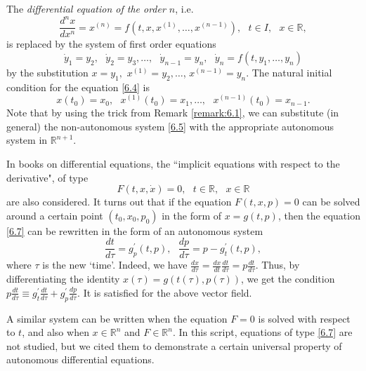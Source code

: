 The \emph{differential equation of the order $n$}, i.e.
\begin{equation}
\label{6.4}
\frac{d^{n}x}{dx^{n}}=x^{(n)}=f(t,x,x^{(1)},\ldots ,x^{(n-1)}),\text{ \ }%
t\in I,\text{\ }x\in \mathbb{R},
\end{equation}
is replaced by the system of first order equations
\begin{equation}
\label{6.5}
\dot{y}_{1}=y_{2},\text{ }\dot{y}_{2}=y_{3},\ldots ,\text{ }\dot{y}%
_{n-1}=y_{n},\text{ }\dot{y}_{n}=f(t,y_{1},\ldots ,y_{n})
\end{equation}
by the substitution $x=y_{1},$ $x^{(1)}=y_{2},\ldots$, $x^{(n-1)} = y_{n}$. The natural initial condition for the equation \eqref{6.4} is
\begin{equation}
\label{6.6}
x(t_{0})=x_{0},\text{ }x^{(1)}(t_{0})=x_{1},\ldots ,\text{\ }%
x^{(n-1)}(t_{0})=x_{n-1}.
\end{equation}
Note that by using the trick from Remark \ref{remark:6.1}, we can substitute (in general) the non-autonomous system \eqref{6.5} with the appropriate autonomous system in $\mathbb{R}^{n+1}.$

\begin{remark}
	In books on differential equations, the ``implicit equations with respect to the derivative", of type
	\begin{equation}
	\label{6.7}
	F(t,x,\dot{x})=0,\text{ \ \ }t\in \mathbb{R},\text{ \ }x\in \mathbb{R}
	\end{equation}
	are also considered. It turns out that if the equation $F(t,x,p)=0$ can be solved around a certain point $\left(t_{0}, x_{0}, p_{0}\right) $ in the form of $x=g(t,p)$, then the equation \eqref{6.7} can be rewritten in the form of an autonomous system
	$$
	\frac{dt}{d\tau }=g_{p}^{\prime }(t,p),\text{ \ }\frac{dp}{d\tau } = p-g_{t}^{\prime }(t,p),
	$$
	where $\tau$ is the new `time'. Indeed, we have $\frac{dx}{d\tau }%
	=\frac{dx}{dt}\frac{dt}{d\tau }=p\frac{dt}{d\tau }.$ Thus, by differentiating the identity $x(\tau) = g(t(\tau ), p(\tau ))$, we get the condition $p\frac{dt}{d\tau }\equiv g_{t}^{\prime }\frac{dt}{d\tau } + g_{p}^{\prime }\frac{dp}{d\tau }.$ It is satisfied for the above vector field.
	
	A similar system can be written when the equation $F=0$ is solved with respect to $t$, and also when $x\in \mathbb{R}^{n}$ and $F\in	\mathbb{R}^{n}$. In this script, equations of type \eqref{6.7} are not studied, but we cited them to demonstrate a certain universal property of autonomous differential equations.
\end{remark}

